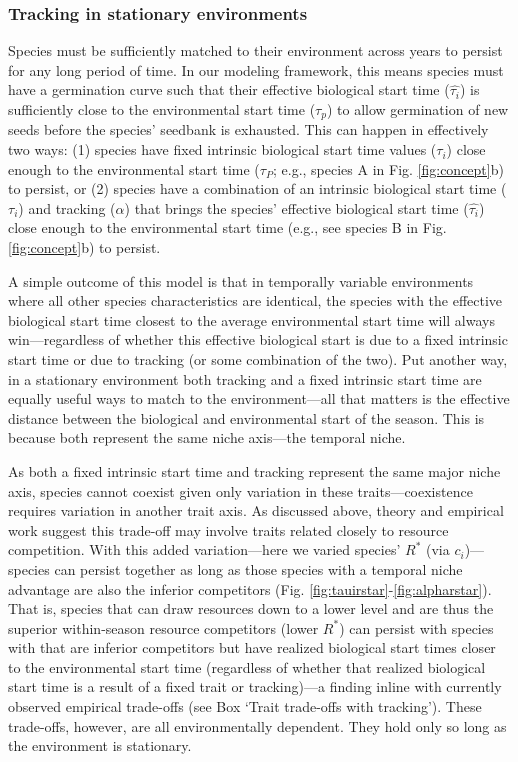 \documentclass[11pt,letterpaper]{article}
\begin{document}
\subsubsection{Tracking in stationary environments}
Species must be sufficiently matched to their environment across years to persist for any long period of time. In our modeling framework, this means species must have a germination curve such that their effective biological start time ($\hat{\tau_{i}}$) is sufficiently close to the environmental start time ($\tau_{p}$) to allow germination of new seeds before the species' seedbank is exhausted. This can happen in effectively two ways: (1) species have fixed intrinsic biological start time values ($\tau_i$) close enough to the environmental start time ($\tau_P$; e.g., species A in Fig. \ref{fig:concept}b) to persist, or (2) species have a combination of an intrinsic biological start time ($\tau_i$) and tracking ($\alpha$) that brings the species' effective biological start time ($\hat{\tau_{i}}$) close enough to the environmental start time (e.g., see species B in Fig. \ref{fig:concept}b) to persist.  

A simple outcome of this model is that in temporally variable environments where all other species characteristics are identical, the species with the effective biological start time closest to the average environmental start time will always win---regardless of whether this effective biological start is due to a fixed intrinsic start time or due to tracking (or some combination of the two). Put another way, in a stationary environment both tracking and a fixed intrinsic start time are equally useful ways to match to the environment---all that matters is the effective distance between the biological and environmental start of the season. This is because both represent the same niche axis---the temporal niche. 

As both a fixed intrinsic start time and tracking represent the same major niche axis, species cannot coexist given only variation in these traits---coexistence requires variation in another trait axis. As discussed above, theory and empirical work suggest this trade-off may involve traits related closely to resource competition. With this added variation---here we varied species' $R^*$ (via $c_i$)---species can persist together as long as those species with a temporal niche advantage are also the inferior competitors (Fig. \ref{fig:tauirstar}-\ref{fig:alpharstar}). That is, species that can draw resources down to a lower level and are thus the superior within-season resource competitors (lower $R^*$) can persist with species with that are inferior competitors but have realized biological start times closer to the environmental start time (regardless of whether that realized biological start time is a result of a fixed trait or tracking)---a finding inline with currently observed empirical trade-offs (see Box `Trait trade-offs with tracking'). These trade-offs, however, are all environmentally dependent. They hold only so long as the environment is stationary. 
\end{document}
